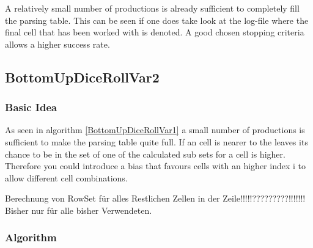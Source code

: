 A relatively small number of productions is already sufficient to completely fill the parsing table. This can be seen if one does take look at the log-file where the final cell that has been worked with is denoted.
A good chosen stopping criteria allows a higher success rate.

\pagebreak
\subsection{BottomUpDiceRollVar2}
\subsubsection{Basic Idea} 
As seen in algorithm \ref{BottomUpDiceRollVar1} a small number of productions is sufficient to make the parsing table quite full. If an cell is nearer to the leaves its chance to be in the set of one of the calculated sub sets for a cell is higher. Therefore you could introduce a bias that favours cells with an higher index i to allow different cell combinations.

Berechnung von RowSet für alles Restlichen Zellen in der Zeile!!!!!?????????!!!!!!!
Bisher nur für alle bisher Verwendeten.

\subsubsection{Algorithm}

